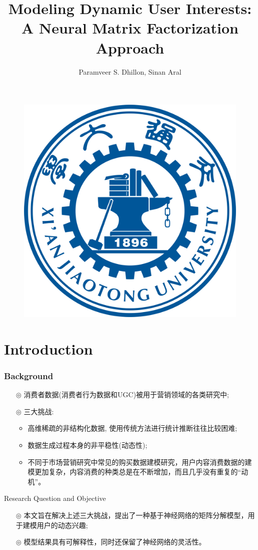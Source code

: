 \documentclass{beamer}
\author{Paramveer S. Dhillon, Sinan Aral}
\title{Modeling Dynamic User Interests: A Neural Matrix Factorization Approach}
\institute{MARKETING SCIENCE 2021}
\date{\zhtoday}
\begin{document}
\begin{frame}
	\titlepage
	\begin{figure}[htpb]
		\begin{center}
			\includegraphics[width=0.2\linewidth]{pic/XJUT_Logo.png}
		\end{center}
	\end{figure}
\end{frame}

\begin{frame}
	\tableofcontents[sectionstyle=show,subsectionstyle=show/shaded/hide,subsubsectionstyle=show/shaded/hide]
\end{frame}

\section{Introduction}

\begin{frame}
	\frametitle{Background}
	\begin{itemize}
		\item[$\circledcirc$] 消费者数据(消费者行为数据和UGC)被用于营销领域的各类研究中;
		\item[$\circledcirc$] 三大挑战:
		      \begin{itemize}
			      \item 高维稀疏的非结构化数据, 使用传统方法进行统计推断往往比较困难;
			      \item 数据生成过程本身的非平稳性(动态性);
			      \item 不同于市场营销研究中常见的购买数据建模研究，用户内容消费数据的建模更加复杂，内容消费的种类总是在不断增加，而且几乎没有重复的“动机”。
		      \end{itemize}
	\end{itemize}
\end{frame}

\begin{frame}{Research Question and Objective}
	\begin{itemize}
		\item[$\circledcirc$] 本文旨在解决上述三大挑战，提出了一种基于神经网络的矩阵分解模型，用于建模用户的动态兴趣;
		\item[$\circledcirc$] 模型结果具有可解释性，同时还保留了神经网络的灵活性。
	\end{itemize}

\end{frame}
\end{document}
